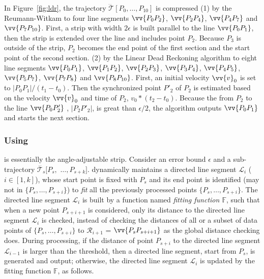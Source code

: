 {\begin{example}
\label{exm-alg-strip}
In Figure~\ref{fig:ldr}, the trajectory $\dddot{\mathcal{T}}[P_0, \ldots, P_{10}]$ is compressed
%
(1) by the Reumann-Witkam to four line segments $\vv{P_0P_2}$, $\vv{P_2P_4}$, $\vv{P_4P_7}$ and $\vv{P_7P_{10}}$. First, a strip with width $2\epsilon$ is built parallel to the line $\vv{P_0P_1}$, then the strip is extended over the line and includes point $P_2$. Because $P_3$ is outside of the strip, $P_2$ becomes the end point of the first section and the start point of the second section.
%
(2) by the Linear Dead Reckoning algorithm to eight line segments $\vv{P_0P_1}$, $\vv{P_1P_2}$, $\vv{P_2P_3}$, $\vv{P_3P_4}$, $\vv{P_4P_5}$, $\vv{P_5P_7}$, $\vv{P_7P_8}$ and $\vv{P_8P_{10}}$. First, an initial velocity ${\vv{v}_0}$ is set to $|P_0P_1|/(t_1-t_0)$. Then the synchronized point $P'_2$ of $P_2$ is estimated based on the velocity ${\vv{v}_0}$ and time of $P_2$, \ie ${v}_0 * (t_2-t_0)$. Because the \sed from $P_2$ to the line $\vv{P_0P'_2}$ , \ie $|P_2P'_2|$, is great than $\epsilon/2$, the algorithm outputs $\vv{P_0P_1}$ and starts the next section.
\end{example}

}%

\subsubsection{\operb Using \ped}
\operb\cite{Lin:Operb} is essentially the angle-adjustable strip\cite{Reumann:Strip}.
Consider an error bound $\epsilon$ and a sub-trajectory $\dddot{\mathcal{T}_s}[P_s,$ $\ldots, P_{s+k}]$.
\operb dynamically maintains a directed line segment $\mathcal{L}_i$ ($i\in[1,k]$), whose start point is fixed with $P_s$ and its end point is identified (may not in $\{P_s, \ldots, P_{s+i}\}$) to {\em fit} all the previously processed points $\{P_s, \ldots, P_{s+i}\}$.
The directed line segment $\mathcal{L}_i$ is built by a function named \emph{fitting function $\mathbb{F}$}, such that when a new point $P_{s+i+1}$ is considered, only its distance to the directed line segment $\mathcal{L}_i$ is checked, instead of checking the distances of all or a subset of data points of $\{P_{s}, \ldots, P_{s+i}\}$ to $\mathcal{R}_{i+1}$ = $\vv{P_sP_{s+i+1}}$ as the global distance checking does.
During processing, if the distance of point $P_{s+i}$ to the directed line segment $\mathcal{L}_{i-1}$ is larger than the threshold, then a directed line segment, start from $P_s$, is generated and output;
otherwise, the directed line segment $\mathcal{L}_i$ is updated by the fitting function $\mathbb{F}$, as follows.

